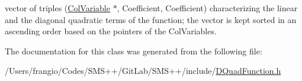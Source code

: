 vector of triples (\mbox{\hyperlink{class_s_m_spp__di__unipi__it_1_1_col_variable}{Col\+Variable}} $\ast$, Coefficient, Coefficient) characterizing the linear and the diagonal quadratic terms of the function; the vector is kept sorted in an ascending order based on the pointers of the Col\+Variables. 

The documentation for this class was generated from the following file\+:\begin{DoxyCompactItemize}
\item 
/\+Users/frangio/\+Codes/\+S\+M\+S++/\+Git\+Lab/\+S\+M\+S++/include/\mbox{\hyperlink{_d_quad_function_8h}{D\+Quad\+Function.\+h}}\end{DoxyCompactItemize}

